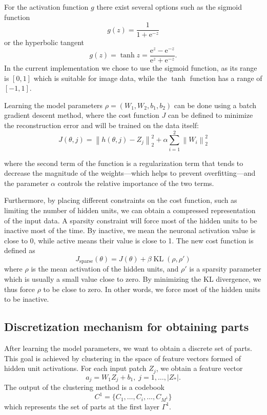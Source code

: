 \documentclass[runningheads]{llncs}
\newcommand{\KL}{\mathop{\textrm{KL}}}
\begin{document}
For the activation function $g$ there exist several options such as the sigmoid function
\begin{equation}
  g(z)=\frac{1}{1+\text{e}^{-z}}
\end{equation}
or the hyperbolic tangent
\begin{equation}
  g(z)=\tanh z=\frac{\text{e}^z-\text{e}^{-z}}{\text{e}^z+\text{e}^{-z}}.
\end{equation}
In the current implementation we chose to use the sigmoid function, as its range is $[0,1]$ which is suitable for image data, while the $\tanh$ function has a range of $[-1,1]$.

Learning the model parameters $\rho=(W_1,W_2,b_1,b_2)$ can be done using a batch gradient descent method, where the cost function $J$ can be defined to minimize the reconstruction error and will be trained on the data itself:
\begin{equation}
   J(\theta,j)=\left\|h(\theta,j)-Z_j\right\|_2^2 + \alpha\sum_{i=1}^{2} \left\|W_i\right\|_2^2
\end{equation}

where the second term of the function is a regularization term that tends to decrease the magnitude of the weights---which helps to prevent overfitting---and the parameter $\alpha$ controls the relative importance of the two terms.
 
Furthermore, by placing different constraints on the cost function, such as limiting the number of hidden units, we can obtain a compressed representation of the input data. A sparsity constraint will force most of the hidden units to be inactive most of the time. By inactive, we mean the neuronal activation value is close to 0, while active means their value is close to 1. The new cost function is defined as
\begin{equation}
J_{\textrm{sparse}}(\theta)=J(\theta)+\beta \KL(\rho,\rho')
\end{equation}
where $\rho$ is the mean activation of the hidden units, and $\rho'$ is a sparsity parameter which is usually a small value close to zero. By minimizing the KL divergence, we thus force $\rho$ to be close to zero. In other words, we force most of the hidden units to be inactive.

\subsection{Discretization mechanism for obtaining parts} 

After learning the model parameters, we want to obtain a discrete set of parts. This goal is achieved by clustering in the space of feature vectors formed of hidden unit activations. For each input patch $Z_j$, we obtain a feature vector
\begin{equation}
a_j=W_1Z_j+b_1, \;j=1,\ldots,|Z_*|.
\end{equation}
The output of the clustering method is a codebook
\begin{equation}
C^1=\{C_1,\ldots,C_i,\ldots,C_{M^1}\}
\end{equation}
which represents the set of parts at the first layer $\Gamma^{1}$. 
\end{document}
